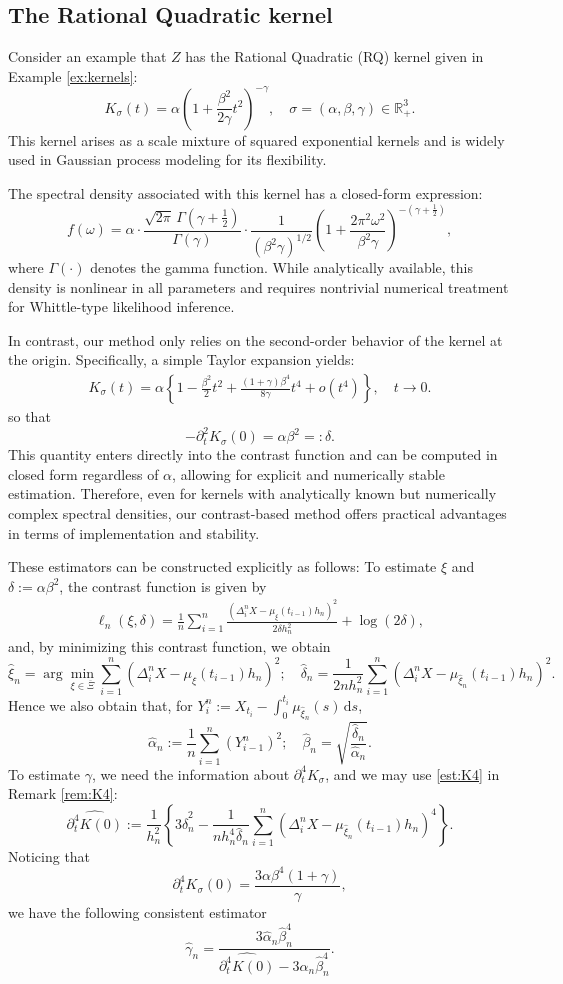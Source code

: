 \documentclass[a4paper,10pt,twoside]{article}
\numberwithin{equation}{section}
\def\R{\mathbb{R}}
\def\D{\Delta}
\def\d{\delta}
\def\l{\left}
\def\r{\right}
\def\a{\alpha}
\def\b{\beta}
\def\g{\gamma}
\def\s{\sigma}
\def\p{\partial}
\def\wh#1{\widehat{#1}}
\def\ol#1{\overline{#1}}
\def\df{\mathrm{d}}
\begin{document}
\subsection{The Rational Quadratic kernel}
Consider an example that $Z$ has the Rational Quadratic (RQ) kernel given in Example \ref{ex:kernels}:
\[
K_\s(t)  = \a \l(1 + \frac{\b^2 }{2\g}t^2 \r)^{-\g},\quad \s=(\a,\b,\g)\in \R_+^3. 
\]
This kernel arises as a scale mixture of squared exponential kernels and is widely used in Gaussian process modeling for its flexibility.

The spectral density associated with this kernel has a closed-form expression:
\[
f(\omega) = \a \cdot \frac{\sqrt{2\pi} \, \Gamma(\gamma + \frac{1}{2})}{\Gamma(\gamma)} \cdot \frac{1}{(\b^2 \gamma)^{1/2}} \l(1 + \frac{2\pi^2 \omega^2}{\b^2 \gamma} \r)^{-(\gamma + \frac{1}{2})},
\]
where $\Gamma(\cdot)$ denotes the gamma function. 
While analytically available, this density is nonlinear in all parameters and requires nontrivial numerical treatment for Whittle-type likelihood inference.

In contrast, our method only relies on the second-order behavior of the kernel at the origin. Specifically, a simple Taylor expansion yields:
\begin{align*}
K_\sigma(t) = \a \l\{1 - \frac{\b^2}{2}t^2  + \frac{(1+\gamma) \b^4 }{8 \gamma} t^4 + o(t^4)\r\}, \quad t \to 0. %
\end{align*}
so that
\[
-\p^2_t K_\s(0) =\a \b^2 =:\d.
\]
This quantity enters directly into the contrast function and can be computed in closed form regardless of $\alpha$, allowing for explicit and numerically stable estimation. Therefore, even for kernels with analytically known but numerically complex spectral densities, our contrast-based method offers practical advantages in terms of implementation and stability.

These estimators can be constructed explicitly as follows: To estimate $\xi$ and $\d:=\a\b^2$, the contrast function is given by
\begin{align*}
\ell_n(\xi,\d) = \frac{1}{n}\sum_{i=1}^n \frac{\l(\D_i^n X - \mu_\xi(t_{i-1})h_n\r)^2}{2\d h_n^2}  + \log (2 \d), 
\end{align*}
and, by minimizing this contrast function, we obtain
\[
\wh{\xi}_n = \arg\min_{\xi\in \ol{\Xi}} \sum_{i=1}^n \l(\D_i^n X - \mu_\xi(t_{i-1})h_n\r)^2;\quad 
\wh{\d}_n = \frac{1}{2nh_n^2} \sum_{i=1}^n \l(\D_i^n X - \mu_{\wh{\xi}_n}(t_{i-1})h_n\r)^2. 
\]
Hence we also obtain that, for $Y_i^n := X_{t_i} - \int_0^{t_i} \mu_{\wh{\xi}_n}(s)\,\df s$, 
\[
\wh{\a}_n:= \frac{1}{n}\sum_{i=1}^n (Y_{i-1}^n)^2;\quad \wh{\b}_n = \sqrt{ \frac{\wh{\d}_n}{\wh{\a}_n} }. 
\]
To estimate $\g$, we need the information about $\p_t^4 K_\s$, and we may use \eqref{est:K4} in Remark \ref{rem:K4}: 
\[
\widehat{\p_t^4 K(0)} := \frac{1}{h_n^2} \left\{3 \wh{\d}_n^2 - \frac{1}{nh_n^4 \wh{\d}_n} \sum_{i=1}^n \left( \D_i^n X - \mu_{\wh{\xi}_n}(t_{i-1}) h_n \right)^4 \right\}. 
\]
Noticing that 
\[
\p_t^4 K_\sigma(0) = \frac{3 \a \b^4 (1 + \g)}{\g},
\]
we have the following consistent estimator 
\[
\wh{\g}_n = \frac{3 \wh{\a}_n \wh{\b}_n^4}{\wh{\p_t^4 K(0)} - 3 \wh{\a}_n \wh{\b}_n^4}.
\]
\end{document}
